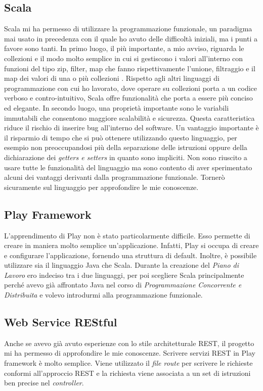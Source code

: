 	\subsection*{Scala}  
	Scala mi ha permesso di utilizzare la programmazione funzionale, un paradigma mai usato in precedenza con il quale ho avuto delle difficoltà iniziali, ma i punti a favore sono tanti. In primo luogo, il più importante, a mio avviso, riguarda le collezioni e il modo molto semplice in cui si gestiscono i valori all'interno con funzioni del tipo zip, filter, map che fanno rispettivamente l'unione, filtraggio e il map dei valori di una o più collezioni . Rispetto agli altri linguaggi di programmazione con cui ho lavorato, dove operare su collezioni porta a un codice verboso e contro-intuitivo, Scala offre funzionalità che porta a essere più conciso ed elegante. In secondo luogo, una proprietà importante sono le variabili immutabili che consentono maggiore scalabilità e sicurezza. Questa caratteristica riduce il rischio di inserire bug all'interno del software. Un vantaggio importante è il risparmio di tempo che si può ottenere utilizzando questo linguaggio, per esempio non preoccupandosi più della separazione delle istruzioni oppure della dichiarazione dei \textit{getters e setters} in quanto sono impliciti. Non sono riuscito a usare tutte le funzionalità del linguaggio ma sono contento di aver sperimentato alcuni dei vantaggi derivanti dalla programmazione funzionale. Tornerò sicuramente sul linguaggio per approfondire le mie conoscenze.
	
	\subsection*{Play Framework}
	L'apprendimento di Play non è stato particolarmente difficile. Esso permette di creare in maniera molto semplice un'applicazione. Infatti, Play si occupa di creare e configurare l'applicazione, fornendo una struttura di default. Inoltre, è possibile utilizzare sia il linguaggio Java che Scala. Durante la creazione del \textit{Piano di Lavoro} ero indeciso tra i due linguaggi, per poi scegliere Scala principalmente perché avevo già affrontato Java nel corso di \textit{Programmazione Concorrente e Distribuita} e volevo introdurmi alla programmazione funzionale.
	
	\subsection*{Web Service REStful}
	 Anche se avevo già avuto esperienze con lo stile architetturale \gls{REST}, il progetto mi ha permesso di approfondire le mie conoscenze. Scrivere servizi \gls{REST} in Play framework è molto semplice. Viene utilizzato il \textit{file route} per scrivere le richieste conformi all'approccio \gls{REST} e la richiesta viene associata a un set di istruzioni ben precise nel \textit{controller}.\\ 
	 
